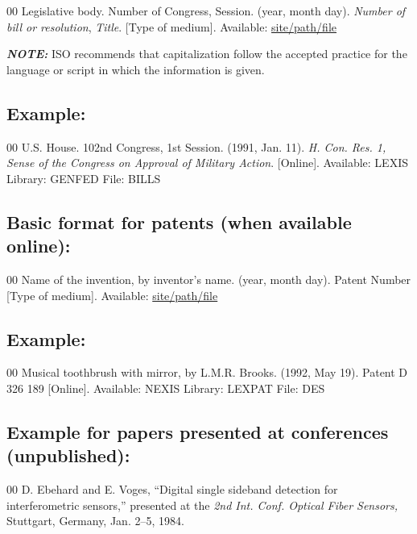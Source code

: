 \documentclass{IEEEtran}
\begin{document}
\begin{thebibliography}{00}
 Legislative body. Number of Congress, Session. (year, month day). \textit{Number of bill or resolution}, \textit{Title}. [Type
of medium]. Available: \underline{site/path/file}
\end{thebibliography}

\textbf{\textit{NOTE: }}ISO recommends that capitalization follow the
accepted practice for the language or script in which the information is
given.

\subsection*{Example:}

\begin{thebibliography}{00}
 U.S. House. 102nd Congress, 1st Session. (1991, Jan. 11). \textit{H. Con. Res. 1, Sense of the Congress on Approval of Military Action}. [Online]. Available: LEXIS Library: GENFED File: BILLS
\end{thebibliography}

\subsection*{Basic format for patents (when available online):}

\begin{thebibliography}{00}
 Name of the invention, by inventor's name. (year, month day). Patent Number [Type
of medium]. Available: \underline{site/path/file}
\end{thebibliography}

\subsection*{Example:}

\begin{thebibliography}{00}
 Musical toothbrush with mirror, by L.M.R. Brooks. (1992, May 19). Patent D 326 189 [Online]. Available: NEXIS Library: LEXPAT File: DES
\end{thebibliography}

\subsection*{Example for papers presented at conferences (unpublished):}

\begin{thebibliography}{00}
 D. Ebehard and E. Voges, ``Digital single sideband
detection for interferometric sensors,'' presented at the \textit{2nd Int. Conf. Optical Fiber Sensors,} Stuttgart, Germany, Jan. 2--5, 1984.
\end{thebibliography}
\end{document}

